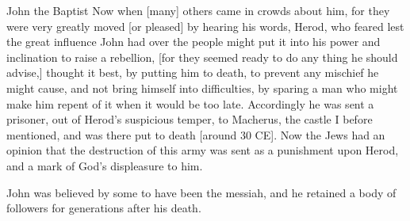 \documentclass[10pt,twoside]{article} %
\newcommand{\quotesize}{\normalsize{}}
\newcommand{\comm}[1]{\begingroup \color{black!50} #1\endgroup}
\newenvironment{quotetext}{\begingroup\quotesize}{\endgroup}
\begin{document}
\begin{section}{John the Baptist}
\begin{quotetext}
Now when [many] others came in crowds about him, for
they were very greatly moved [or pleased] by hearing his words, Herod,
who feared lest the great influence John had over the people might put
it into his power and inclination to raise a rebellion, [for they
seemed ready to do any thing he should advise,] thought it best, by
putting him to death, to prevent any mischief he might cause, and not
bring himself into difficulties, by sparing a man who might make him
repent of it when it would be too late. Accordingly he was sent a
prisoner, out of Herod's suspicious temper, to Macherus, the castle I
before mentioned, and was there put to death [around 30 CE]. Now the Jews had an
opinion that the destruction of this army was sent as a punishment
upon Herod, and a mark of God's displeasure to him.
\end{quotetext}

\comm{
John was believed by some to have been the messiah, and he retained a body of followers for
generations after his death.
}


\end{section}
\end{document}
